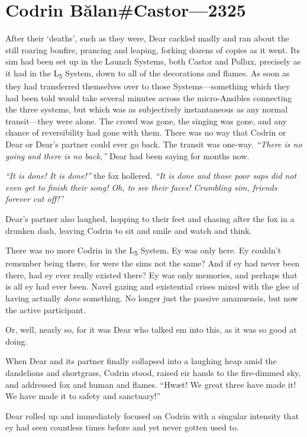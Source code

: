 \hypertarget{codrin-bux103lancastor-2325}{%
\chapter{Codrin Bălan\#Castor—2325}\label{codrin-bux103lancastor-2325}}

After their `deaths', such as they were, Dear cackled madly and ran about the still roaring bonfire, prancing and leaping, forking dozens of copies as it went. Its sim had been set up in the Launch Systems, both Castor and Pollux, precisely as it had in the L\textsubscript{5} System, down to all of the decorations and flames. As soon as they had transferred themselves over to those Systems---something which they had been told would take several minutes across the micro-Ansibles connecting the three systems, but which was as subjectively instantaneous as any normal transit---they were alone. The crowd was gone, the singing was gone, and any chance of reversibility had gone with them. There was no way that Codrin or Dear or Dear's partner could ever go back. The transit was one-way. \emph{``There is no going and there is no back,''} Dear had been saying for months now.

\emph{``It is done! It is done!''} the fox hollered. \emph{``It is done and those poor saps did not even get to finish their song! Oh, to see their faces! Crumbling sim, friends forever cut off!''}

Dear's partner also laughed, hopping to their feet and chasing after the fox in a drunken dash, leaving Codrin to sit and smile and watch and think.

There was no more Codrin in the L\textsubscript{5} System. Ey was only here. Ey couldn't remember being there, for were the sims not the same? And if ey had never been there, had ey ever really existed there? Ey was only memories, and perhaps that is all ey had ever been. Navel gazing and existential crises mixed with the glee of having actually \emph{done} something. No longer just the passive amanuensis, but now the active participant.

Or, well, nearly so, for it was Dear who talked em into this, as it was so good at doing.

When Dear and its partner finally collapsed into a laughing heap amid the dandelions and shortgrass, Codrin stood, raised eir hands to the fire-dimmed sky, and addressed fox and human and flames. ``Hwæt! We great three have made it! We have made it to safety and sanctuary!''

Dear rolled up and immediately focused on Codrin with a singular intensity that ey had seen countless times before and yet never gotten used to.

